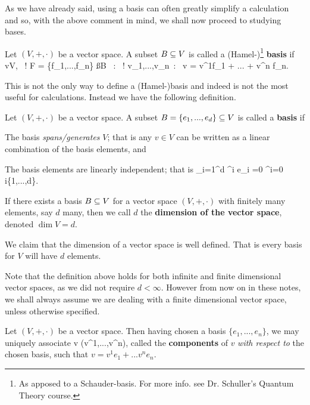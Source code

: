 As we have already said, using a basis can often greatly simplify a calculation and so, with the above comment in mind, we shall now proceed to studying bases. 

    Let $(V,+,\cdot)$ be a vector space. A subset $B\subseteq V$ is called a (Hamel-)\footnote{As apposed to a Schauder-basis. For more info. see Dr. Schuller's Quantum Theory course.} \textbf{basis} if 
    \bse 
        \forall v\in V, \, \exists !  F = \{f_1,...,f_n\} \ss B \, : \, \exists ! v_1,...,v_n\in\R \, : \, v = v^1f_1 + ... + v^n f_n.
    \ese 
\ed 

This is not the only way to define a (Hamel-)basis and indeed is not the most useful for calculations. Instead we have the following definition.

    Let $(V,+,\cdot)$ be a vector space. A subset $B =\{e_1,...,e_d\} \subseteq V$ is called a \textbf{basis} if 
    \benr 
        \item The basis \textit{spans/generates} $V$; that is any $v\in V$ can be written as a linear combination of the basis elements, and 
        \item The basis elements are linearly independent; that is
        \bse 
            \sum_{i=1}^d \lambda^i e_i =0 \quad \implies \quad  \lambda^i=0 \quad \forall i\in \{1,...,d\}.
        \ese 
    \een 
\ed 

    If there exists a basis $B\subseteq V$ for a vector space $(V,+,\cdot)$ with finitely many elements, say $d$ many, then we call $d$ the \textbf{dimension of the vector space}, denoted $\dim V =d$.
\ed 

\bcl 
    We claim that the dimension of a vector space is well defined. That is every basis for $V$ will have $d$ elements. 
\ecl 

Note that the definition above holds for both infinite and finite dimensional vector spaces, as we did not require $d<\infty$. However from now on in these notes, we shall always assume we are dealing with a finite dimensional vector space, unless otherwise specified.

\br 
\label{rem:ComponentsWRTBasis}
    Let $(V,+,\cdot)$ be a vector space. Then having chosen a basis $\{e_1,...,e_n\}$, we may uniquely associate 
    \bse 
        v \mapsto (v^1,...,v^n),
    \ese 
    called the \textbf{components} of $v$ \textit{with respect to} the chosen basis, such that $v=v^1e_1 + ... v^ne_n$.
\er 


